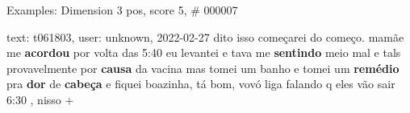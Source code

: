 \begin{frame}{Examples: Dimension 3 pos, score 5, \# 000007}
\footnotesize
\begin{exampleblock}{text: t061803, user: unknown, 2022-02-27}
dito isso começarei do começo. mamãe me \textbf{acordou} por volta das 5:40 eu 
levantei e tava me \textbf{sentindo} meio mal e tals provavelmente por 
\textbf{causa} da vacina mas tomei um banho e tomei um \textbf{remédio} pra 
\textbf{dor} de \textbf{cabeça} e fiquei boazinha, tá bom, vovó liga falando q 
eles vão sair 6:30 , nisso + 
\end{exampleblock}
\end{frame}
